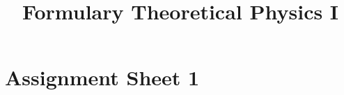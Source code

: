\documentclass{report}
\title{Formulary Theoretical Physics I}
\begin{document}
\chapter{Assignment Sheet 1}

\section{}

\subsection{}

\subsection{}

\subsection{}

\subsection{}

\section{}

\subsection{}

\subsection{}

\section{}

\subsection{}

\subsection{}
\end{document}
